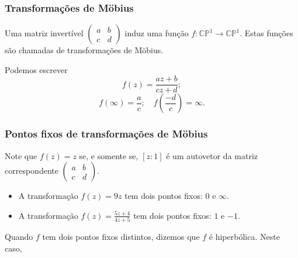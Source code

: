 \documentclass{beamer}
\begin{document}
\begin{frame}
    \frametitle{Transformações de Möbius}

    \begin{exampleblock}{}
        Uma matriz invertível $\begin{pmatrix}
            a & b\\
            c & d
        \end{pmatrix}$ induz uma função $f : \mathbb{CP}^1\to\mathbb{CP}^1$.
        Estas funções são chamadas de transformações de Möbius.
    \end{exampleblock}
    \pause
    \begin{exampleblock}{}
    Podemos escrever
        \[f(z) = \frac{az+b}{cz+d};\]
        \[f(\infty) = \frac{a}{c};\quad f\left(\frac{-d}{c}\right) = \infty.\]
    \end{exampleblock}
\end{frame}
\begin{frame}
    \frametitle{Pontos fixos de transformações de Möbius}
    \begin{exampleblock}{}
        Note que $f(z) = z$ se, e somente se, $[z:1]$ é um autovetor da matriz correspondente $\begin{pmatrix}
            a & b\\
            c & d
        \end{pmatrix}$.
    \end{exampleblock}
    \pause
    \begin{example}
        \begin{itemize}
            \item A transformação $f(z) = 9z$ tem dois pontos fixos: $0$ e $\infty$.
            \item A transformação $f(z) = \frac{5z + 4}{4z + 5}$ tem dois pontos fixos: $1$ e $-1$.
        \end{itemize}
    \end{example}

    \begin{exampleblock}
        Quando $f$ tem dois pontos fixos distintos, dizemos que $f$ é hiperbólica. Neste caso, 
    \end{exampleblock}
    

\end{frame}
\end{document}
